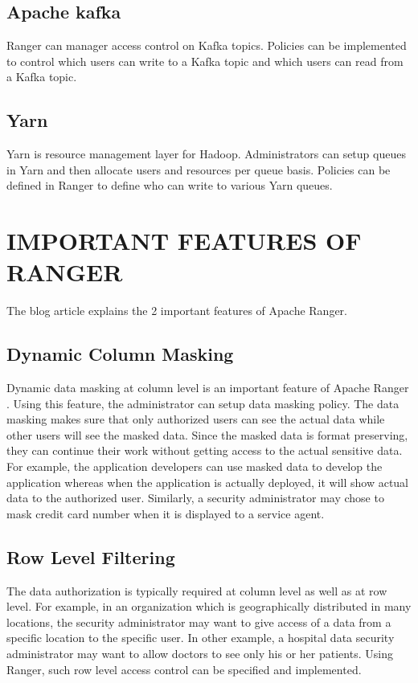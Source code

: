\documentclass[9pt,twocolumn,twoside]{../../styles/osajnl}
\begin{document}
\subsection{Apache kafka}
Ranger can manager access control on Kafka topics. Policies can be
implemented to control which users can write to a Kafka topic and which users
can read from a Kafka topic.

\subsection{Yarn}
Yarn is resource management layer for Hadoop. Administrators can setup queues
 in Yarn and then allocate users and resources per queue basis. Policies can
 be defined in Ranger to define who can write to various Yarn queues.

\section{IMPORTANT FEATURES OF RANGER}
The blog article \cite{www-ranger-key-features} explains the 2 important
features of Apache Ranger.

\subsection{Dynamic Column Masking}
Dynamic data masking at column level is an important feature of Apache Ranger
. Using this feature, the administrator can setup data masking policy. The
data masking makes sure that only authorized users can see the actual data
while other users will see the masked data. Since the masked data is format
preserving, they can continue their work without getting access to the actual
 sensitive data. For example, the application developers can use masked data
 to develop the application whereas when the application is actually
 deployed, it will show actual data to the authorized user. Similarly, a
 security administrator may chose to mask credit card number when it is
 displayed to a service agent.

\subsection{Row Level Filtering}
The data authorization is typically required at column level as well as at row
level. For example, in an organization which is geographically distributed in
 many locations, the security administrator may want to give access of a data
  from a specific location to the specific user. In other example, a
  hospital data security administrator may want to allow doctors to see
  only his or her patients. Using Ranger, such row level access control can
  be specified and implemented.
\end{document}
